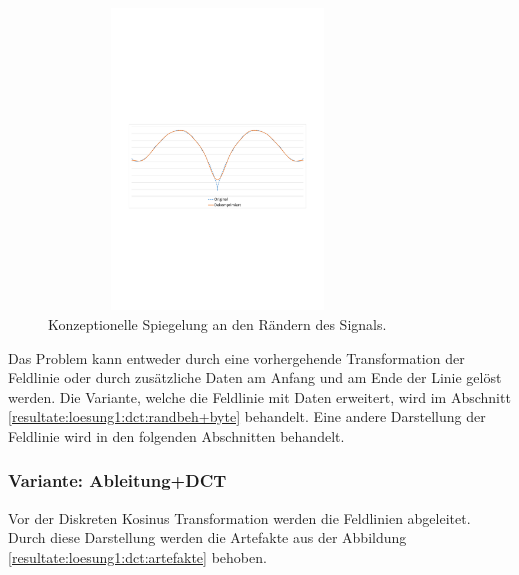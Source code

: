\begin{figure}[!htbp]
	\center
	\includegraphics[trim = 1.8cm 10.5cm 1.8cm 12cm, clip=true, width=0.8\textwidth,height=8cm,keepaspectratio]{./pictures/resultate/loesung1/loesung1-0/spiegelung.pdf}
	\caption{Konzeptionelle Spiegelung an den Rändern des Signals.}
	\label{resultate:loesung1:dct:spiegelung}
\end{figure}
Das Problem kann entweder durch eine vorhergehende Transformation der Feldlinie oder durch zusätzliche Daten am Anfang und am Ende der Linie gelöst werden. Die Variante, welche die Feldlinie mit Daten erweitert, wird im Abschnitt \ref{resultate:loesung1:dct:randbeh+byte} behandelt. Eine andere Darstellung der Feldlinie wird in den folgenden Abschnitten behandelt.

\subsubsection{Variante: Ableitung+DCT}\label{resultate:dct:ableitung_dct}
Vor der Diskreten Kosinus Transformation werden die Feldlinien abgeleitet. Durch diese Darstellung werden die Artefakte aus der Abbildung \ref{resultate:loesung1:dct:artefakte} behoben.

